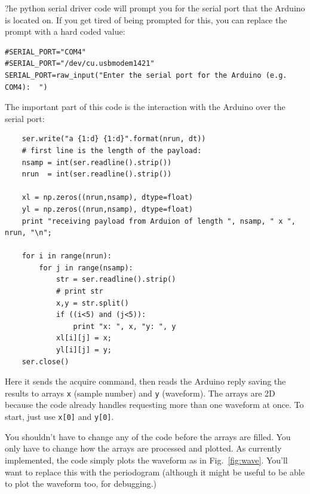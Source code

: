 \documentclass[12pt]{article}
\begin{document}
?he python serial driver code will prompt you for the serial port that the Arduino is located on.  If you get tired of being prompted for this, you can replace the prompt with a hard coded value:
\begin{verbatim}
#SERIAL_PORT="COM4"                                                                                                     
#SERIAL_PORT="/dev/cu.usbmodem1421"                                                                                     
SERIAL_PORT=raw_input("Enter the serial port for the Arduino (e.g. COM4):  ")
\end{verbatim}
The important part of this code is the interaction with the Arduino over the serial port:
\begin{verbatim}
    ser.write("a {1:d} {1:d}".format(nrun, dt))
    # first line is the length of the payload:                                                                          
    nsamp = int(ser.readline().strip())
    nrun  = int(ser.readline().strip())

    xl = np.zeros((nrun,nsamp), dtype=float)
    yl = np.zeros((nrun,nsamp), dtype=float)
    print "receiving payload from Arduion of length ", nsamp, " x ", nrun, "\n";

    for i in range(nrun):
        for j in range(nsamp):
            str = ser.readline().strip()
            # print str                                                                                                 
            x,y = str.split()
            if ((i<5) and (j<5)):
                print "x: ", x, "y: ", y
            xl[i][j] = x;
            yl[i][j] = y;
    ser.close()
\end{verbatim}
Here it sends the acquire command, then reads the Arduino reply saving the results to arrays {\tt x} (sample number) and {\tt y} (waveform).  The arrays are 2D because the code already handles requesting more than one waveform at once.  To start, just use {\tt x[0]} and {\tt y[0]}. 

You shouldn't have to change any of the code before the arrays are filled.  You only have to change how the arrays are processed and plotted.  As currently implemented, the code simply plots the waveform as in Fig.~\ref{fig:wave}.  You'll want to replace this with the periodogram (although it might be useful to be able to plot the waveform too, for debugging.)
  
\end{document}
